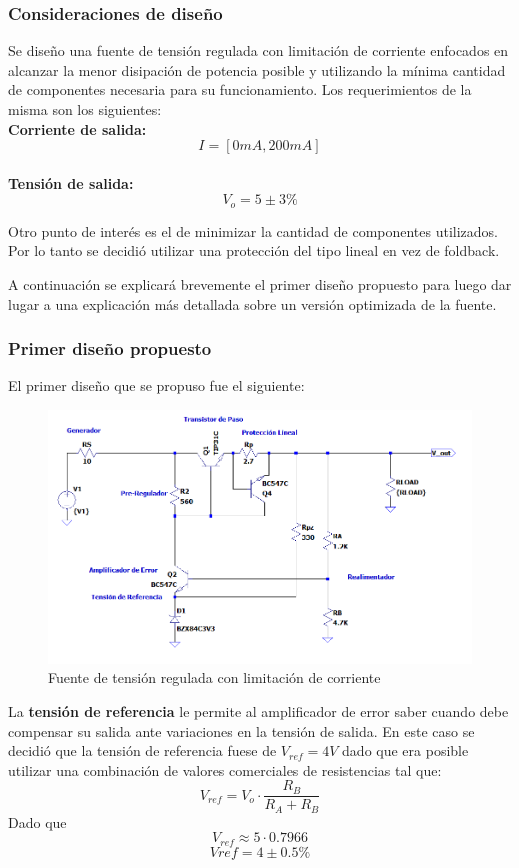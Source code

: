 \subsubsection{Consideraciones de diseño}
Se diseño una fuente de tensión regulada con limitación de corriente enfocados en alcanzar la menor disipación de potencia posible y utilizando la mínima cantidad de componentes necesaria para su funcionamiento.
Los requerimientos de la misma son los siguientes:
\\ 
\textbf{Corriente de salida:}
\begin{equation}
	I = [0mA, 200mA]
\end{equation}
\\
\textbf{Tensión de salida:}
\begin{equation}
V_{o} = 5 \pm 3\%
\end{equation}

Otro punto de interés es el de minimizar la cantidad de componentes utilizados. Por lo tanto se decidió utilizar una protección del tipo lineal en vez de foldback.

A continuación se explicará brevemente el primer diseño propuesto para luego dar lugar a una explicación más detallada sobre un versión optimizada de la fuente.

\subsubsection{Primer diseño propuesto}
El primer diseño que se propuso fue el siguiente:
\begin{figure}[H]
	\centering
	\includegraphics[width=0.7\linewidth]{ImagenesEjercicio1/ImagenCircuitoFV}
	\caption{Fuente de tensión regulada con limitación de corriente}
	\label{fig:imagencircuito}
\end{figure}

La \textbf{tensión de referencia} le permite al amplificador de error saber cuando debe compensar su salida ante variaciones en la tensión de salida. 
En este caso se decidió que la tensión de referencia fuese de $V_{ref} = 4V$ dado que era posible utilizar una combinación de valores comerciales de resistencias tal que:
\begin{equation}
	V_{ref}  = V_{o} \cdot \frac{R_B}{R_A + R_B}
\end{equation} 
Dado que 
\begin{equation}
	V_{ref} \approx 5 \cdot 0.7966
\end{equation}
\begin{equation}
	V{ref} = 4 \pm 0.5 \%
\end{equation}

